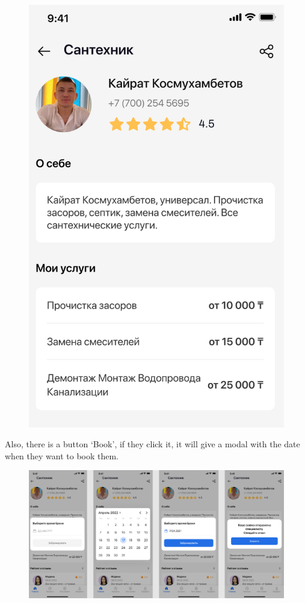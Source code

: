 \begin{figure}[H]
    \includegraphics[scale=0.55]{images/func4.png}
\end{figure}
Also, there is a button ‘Book’, if they click it, it will give a modal with the date when they want to book them.
\begin{figure}[H]
    \centering
    \includegraphics[scale=0.55]{images/func5.png}
\end{figure}
